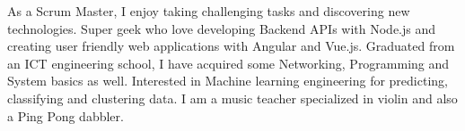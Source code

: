 

\begin{cvparagraph}\justify

As a Scrum Master, I enjoy taking challenging tasks and discovering new technologies. Super geek who love developing Backend APIs with Node.js and creating user friendly web applications with Angular and Vue.js. Graduated from an ICT engineering school, I have acquired some Networking, Programming and System basics as well. Interested in Machine learning engineering for predicting, classifying and clustering data. I am a music teacher specialized in violin and also a Ping Pong dabbler.
\end{cvparagraph}
